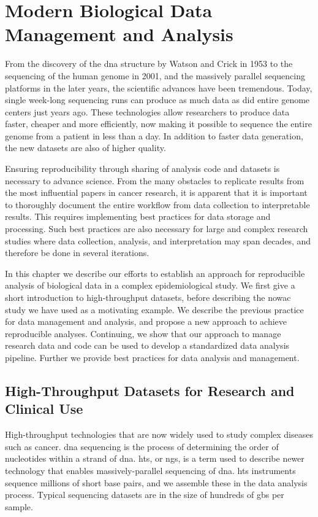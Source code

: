 \chapter{Modern Biological Data Management and Analysis}\label{biodata}
From the discovery of the \gls{dna} structure by Watson and Crick in
1953\cite{watson1953molecular} to the sequencing of the human genome in
2001,\cite{venter2001sequence,international2001initial} and the massively
parallel sequencing platforms in the later years\cite{metzker2010sequencing},
the scientific advances have been tremendous. Today, single week-long sequencing
runs can produce as much data as did entire genome centers just years
ago.\cite{kahn2011future}  These technologies allow researchers to produce data
faster, cheaper and more efficiently, now making it possible to sequence the
entire genome from a patient in less than a day. In addition to faster
data generation, the new datasets are also of higher quality.

Ensuring reproducibility through sharing of analysis code and datasets is
necessary to advance science.\cite{baker2016scientists} From the many obstacles
to replicate results from the most influential papers in cancer
research\cite{reprod}, it is apparent that it is important to thoroughly
document the entire workflow from data collection to interpretable results.
This requires implementing best practices for data storage and processing. Such
best practices are also necessary for large and complex research studies where
data collection, analysis, and interpretation may span decades, and therefore be
done in several iterations. 

In this chapter we describe our efforts to establish an approach for
reproducible analysis of biological data in a complex epidemiological study. We
first give a short introduction to high-throughput datasets, before describing
the \gls{nowac} study we have used as a motivating example. We describe the
previous practice for data management and analysis, and propose a new approach
to achieve reproducible analyses. Continuing, we show that our approach to
manage research data and code can be used to develop a standardized data
analysis pipeline. Further we provide best practices for data analysis and
management. 

\section{High-Throughput Datasets for Research and Clinical Use} 
High-throughput technologies that are now widely used to study complex diseases
such as cancer. \gls{dna} sequencing is the process of determining the order of
nucleotides within a strand of \gls{dna}. \gls{hts}, or \gls{ngs}, is a term
used to describe newer technology that enables massively-parallel sequencing of
\gls{dna}. \gls{hts} instruments sequence millions of short base pairs, and we
assemble these in the data analysis process. Typical sequencing datasets are in
the size of hundreds of \glspl{gb} per sample. 

